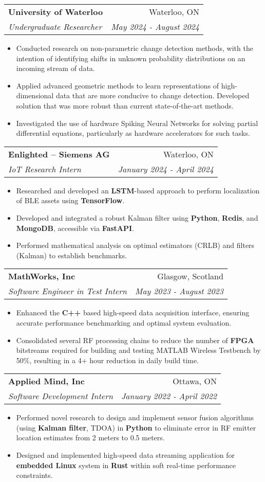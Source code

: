 \documentclass[letterpaper,11pt]{article}
\makeatletter
\newcommand{\resumeItem}[1]{
  \item\small{
    {#1 \vspace{-2pt}}
  }
}
\newcommand{\resumeSubheading}[4]{
  \vspace{-1pt}\item[]
  \begin{tabular*}{0.98\textwidth}{l@{\extracolsep{\fill}}r}
      \hspace{-10pt}\textbf{#1} & #2 \\
      \hspace{-10pt}\textit{\small#3} & \textit{\small #4} \\
    \end{tabular*}\vspace{-5pt}
}
\newcommand{\resumeItemListStart}{\begin{itemize}}
\newcommand{\resumeItemListEnd}{\end{itemize}\vspace{-5pt}}
\makeatother
\begin{document}
    \resumeSubheading
      {University of Waterloo}{Waterloo, ON}
      {Undergraduate Researcher}{May 2024 - August 2024}
    \resumeItemListStart
        \resumeItem{Conducted research on non-parametric change detection methods, with the intention of identifying shifts in unknown probability distributions on an incoming stream of data.}
        \resumeItem{Applied advanced geometric methods to learn representations of high-dimensional data that are more conducive to change detection. Developed solution that was more robust than current state-of-the-art methods.}
        \resumeItem{Investigated the use of hardware Spiking Neural Networks for solving partial differential equations, particularly as hardware accelerators for such tasks.}
    \resumeItemListEnd
    \vspace{-10pt}

    \resumeSubheading
      {Enlighted -- Siemens AG}{Waterloo, ON}
      {IoT Research Intern}{January 2024 - April 2024}
    \resumeItemListStart
      \resumeItem{Researched and developed an \textbf{LSTM}-based approach to perform localization of BLE assets using \textbf{TensorFlow}.}
      \resumeItem{Developed and integrated a robust Kalman filter using \textbf{Python}, \textbf{Redis}, and \textbf{MongoDB}, accessible via \textbf{FastAPI}.}
      \resumeItem{Performed mathematical analysis on optimal estimators (CRLB) and filters (Kalman) to establish benchmarks.}
    \resumeItemListEnd
    \vspace{-10pt}

    \resumeSubheading
      {MathWorks, Inc}{Glasgow, Scotland}
      {Software Engineer in Test Intern}{May 2023 - August 2023}
      \resumeItemListStart
        \resumeItem{Enhanced the \textbf{C++} based high-speed data acquisition interface, ensuring accurate performance benchmarking and optimal system evaluation.}
        \resumeItem{Consolidated several RF processing chains to reduce the number of \textbf{FPGA} bitstreams required for building and testing MATLAB Wireless Testbench by 50\%, resulting in a 4+ hour reduction in daily build time.}

      \resumeItemListEnd
      \vspace{-5pt}

    \resumeSubheading
      {Applied Mind, Inc}{Ottawa, ON}
      {Software Development Intern}{January 2022 - April 2022}
      \resumeItemListStart
      \resumeItem{Performed novel research to design and implement sensor fusion algorithms (using \textbf{Kalman filter}, TDOA) in \textbf{Python} to eliminate error in RF emitter location estimates from 2 meters to 0.5 meters.}
      \resumeItem{Designed and implemented high-speed data streaming application for \textbf{embedded Linux} system in \textbf{Rust} within soft real-time performance constraints.}
      \resumeItemListEnd
      \vspace{-5pt}
\end{document}
